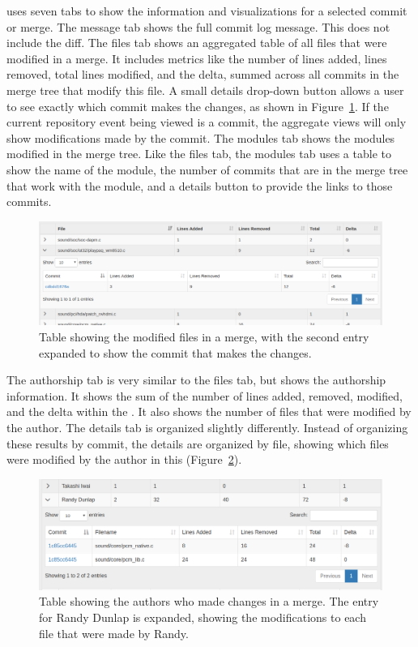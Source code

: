 \documentclass[conference, draftclsnofoot, draft]{IEEEtran}
\begin{document}
\tool uses seven tabs to show the information and visualizations for a
selected commit or merge. The message tab shows the full commit log
message. This does not include the diff. The files tab shows an
aggregated table of all files that were modified in a merge. It includes
metrics like the number of lines added, lines removed, total lines
modified, and the delta, summed across all commits in the merge tree
that modify this file. A small details drop-down button allows a user to
see exactly which commit makes the changes, as shown in
Figure~\ref{fig:linvis_files}. If the current repository event being
viewed is a commit, the aggregate views will only show modifications
made by the commit. The modules tab shows the modules modified in the
merge tree. Like the files tab, the modules tab uses a table to show the
name of the module, the number of commits that are in the merge tree
that work with the module, and a details button to provide the links to
those commits.

\begin{figure}[htpb]
  \centering
  \includegraphics[width=1.0\linewidth]{figures/linvis/linvis_files.png}
  \caption{Table showing the modified files in a merge, with the second
  entry expanded to show the commit that makes the changes.}
  \label{fig:linvis_files}
\end{figure}

The authorship tab is very similar to the files tab, but shows the
authorship information. It shows the sum of the number of lines added,
removed, modified, and the delta within the \mt. It also shows
the number of files that were modified by the author. The details tab is
organized slightly differently. Instead of organizing these results by
commit, the details are organized by file, showing which files were
modified by the author in this \mt (Figure~\ref{fig:linvis_authors}).

\begin{figure}[htpb]
  \centering
  \includegraphics[width=1.0\linewidth]{figures/linvis/linvis_authors.png}
  \caption{Table showing the authors who made changes in a merge. The
    entry for Randy Dunlap is expanded, showing the modifications to
    each file that were made by Randy.}
  \label{fig:linvis_authors}
\end{figure}
\end{document}
